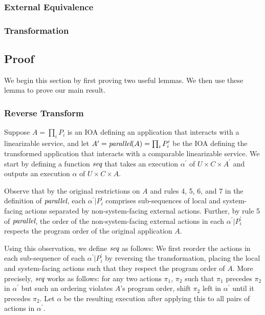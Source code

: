 \subsubsection{External Equivalence}
\label{sec:equivalence:preliminaries:equivalence}

\subsubsection{Transformation}
\label{sec:equivalence:preliminaries:transform}

\subsection{Proof}
\label{sec:equivalence:proof}

We begin this section by first proving two useful lemmas.
We then use these lemma to prove our main result.

\subsubsection{Reverse Transform}

Suppose $A = \prod_i P_i$ is an IOA defining an application that interacts with a linearizable service,
and let $A^\prime = \operatorname*{\textit{parallel}}(A) = \prod_i P_i^\prime$ be the IOA defining the transformed application that
interacts with a comparable \multidispatch{} linearizable service. We start by defining
a function $\operatorname*{\textit{seq}}$ that takes an execution $\alpha^\prime$ of
$U \times C \times A^\prime$ and outputs an execution $\alpha$ of $U \times C \times A$.

Observe that by the original restrictions on $A$ and rules 4, 5, 6, and 7 in the definition
of $\operatorname*{\textit{parallel}}$, each $\alpha^\prime | P_i^\prime$ comprises sub-sequences of local and
system-facing actions separated by non-system-facing external actions. Further, by rule 5
of $\operatorname*{\textit{parallel}}$, the order of the non-system-facing external actions in each $\alpha^\prime | P_i^\prime$
respects the program order of the original application $A$.

Using this observation, we define $\operatorname*{\textit{seq}}$ as follows: We first reorder the actions in
each sub-sequence of each $\alpha^\prime | P_i^\prime$ by reversing the
transformation, placing the local and system-facing actions such that they respect the program
order of $A$. More precisely, $\operatorname*{\textit{seq}}$ works as follows:
for any two actions $\pi_1$, $\pi_2$ such that $\pi_1$ precedes $\pi_2$ in $\alpha^\prime$ but such
an ordering violates $A$'s program order, shift $\pi_2$ left in $\alpha^\prime$ until it precedes $\pi_2$.
Let $\alpha$ be the resulting execution after applying this to all pairs of actions in $\alpha^\prime$.

